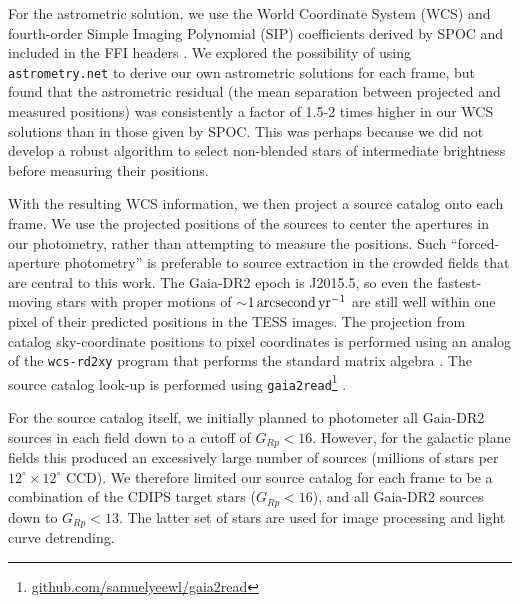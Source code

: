 \documentclass[12pt,twocolumn,tighten]{aastex62}
\begin{document}
For the astrometric solution, we use the World Coordinate System (WCS)
and fourth-order Simple Imaging Polynomial (SIP) coefficients
derived by SPOC and included in the FFI headers
\citep[][Sec.~8]{pence_fits_2010}.  We explored the possibility of
using \texttt{astrometry.net} \citep{lang_2010} to derive our own
astrometric solutions for each frame, but found that the astrometric
residual (the mean separation between projected and measured
positions) was consistently a factor of 1.5-2 times higher in our WCS
solutions than in those given by SPOC.  This was perhaps because
we did not develop a robust
algorithm to select non-blended stars of intermediate brightness before
measuring their positions.

With the resulting WCS information, we then project a source catalog
onto each frame. 
We use the
projected positions of the sources to center the apertures in our
photometry,
rather than attempting to measure the positions.  Such
``forced-aperture photometry'' is preferable to source
extraction in the crowded fields that are central to this work.  The
Gaia-DR2 epoch is J2015.5, so even the fastest-moving stars with
proper motions of $\sim$$1\,{\rm arcsecond}\,{\rm yr}^{-1}$ are still
well within one pixel of their predicted positions in the TESS images.
The projection from catalog sky-coordinate positions to pixel
coordinates is performed using an analog of the \texttt{wcs-rd2xy}
program that performs the standard matrix algebra \citep{lang_2010}.
The source catalog look-up is performed using
\texttt{gaia2read}\footnote{\url{github.com/samuelyeewl/gaia2read}}
\citep{kim_2018_gaia2read}.

For the source catalog itself, we initially planned to photometer all Gaia-DR2
sources in each field down to a cutoff of $G_{Rp} < 16$.  However,
for the galactic plane fields this produced an excessively
large number of sources (millions of stars per
$12^\circ\times12^\circ$ CCD).  We therefore limited our source
catalog for each frame to be
a combination of the CDIPS target stars ($G_{Rp} < 16$), and
all Gaia-DR2 sources down to $G_{Rp} < 13$.  
The latter set of stars are used for image processing and
light curve detrending.
\end{document}
